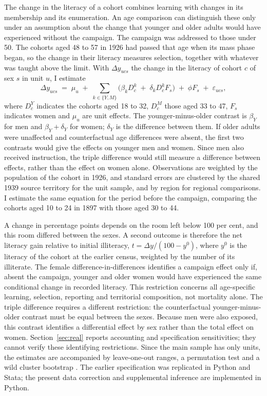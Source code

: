 \documentclass[12pt]{article}
\makeatletter
\newcommand{\N}[1]{\@ifundefined{num@#1}{\textbf{[#1]}}{\@nameuse{num@#1}}}
\makeatother
\begin{document}
The change in the literacy of a cohort combines learning with changes in its membership and its enumeration. An age comparison can distinguish these only under an assumption about the change that younger and older adults would have experienced without the campaign. The campaign was addressed to those under 50. The cohorts aged 48 to 57 in 1926 had passed that age when its mass phase began, so the change in their literacy measures selection, together with whatever was taught above the limit. With $\Delta y_{ucs}$ the change in the literacy of cohort $c$ of sex $s$ in unit $u$, I estimate
\begin{equation}\label{eq:m3}
  \Delta y_{ucs} \;=\; \mu_u \;+\; \sum_{k\in\{Y,M\}}\big(\beta_k D^k_c \;+\; \delta_k D^k_c F_s\big) \;+\; \phi F_s \;+\; \varepsilon_{ucs},
\end{equation}
where $D^Y_c$ indicates the cohorts aged 18 to 32, $D^M_c$ those aged 33 to 47, $F_s$ indicates women and $\mu_u$ are unit effects. The younger-minus-older contrast is $\beta_Y$ for men and $\beta_Y+\delta_Y$ for women; $\delta_Y$ is the difference between them. If older adults were unaffected and counterfactual age differences were absent, the first two contrasts would give the effects on younger men and women. Since men also received instruction, the triple difference would still measure a difference between effects, rather than the effect on women alone. Observations are weighted by the population of the cohort in 1926, and standard errors are clustered by the shared 1939 source territory for the unit sample, and by region for regional comparisons. I estimate the same equation for the period before the campaign, comparing the cohorts aged 10 to 24 in 1897 with those aged 30 to 44.

A change in percentage points depends on the room left below 100 per cent, and this room differed between the sexes. A second outcome is therefore the net literacy gain relative to initial illiteracy, $t=\Delta y/(100-y^{0})$, where $y^{0}$ is the literacy of the cohort at the earlier census, weighted by the number of its illiterate. The female difference-in-differences identifies a campaign effect only if, absent the campaign, younger and older women would have experienced the same conditional change in recorded literacy. This restriction concerns all age-specific learning, selection, reporting and territorial composition, not mortality alone. The triple difference requires a different restriction: the counterfactual younger-minus-older contrast must be equal between the sexes. Because men were also exposed, this contrast identifies a differential effect by sex rather than the total effect on women. Section~\ref{sec:real} reports accounting and specification sensitivities; they cannot verify these identifying restrictions. Since the main sample has only \N{w2.units} units, the estimates are accompanied by leave-one-out ranges, a permutation test and a wild cluster bootstrap \citep{cameron2008}. The earlier specification was replicated in Python and Stata; the present data correction and supplemental inference are implemented in Python.
\end{document}
